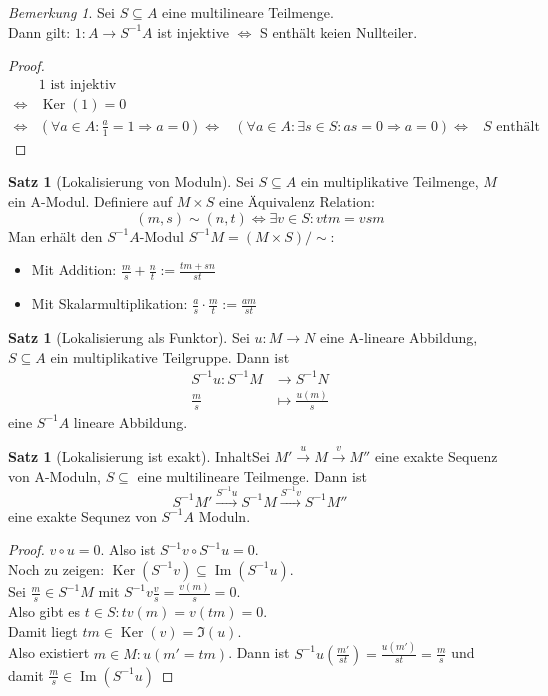 \documentclass[10pt,a4paper]{article}
\newcommand{\Ker}{\ensuremath{\operatorname{Ker}}}
\newcommand{\Img}{\ensuremath{\operatorname{Im}}}
\newcounter{thm}[section]
\theoremstyle{definition}
\newtheorem{satz}[thm]{Satz}
\theoremstyle{plain}
\theoremstyle{remark}
\newtheorem{bem}[thm]{Bemerkung}
\begin{document}
\begin{bem}
	Sei $S\subseteq A$ eine multilineare Teilmenge.\\
	Dann gilt: $1:A\rightarrow S^{-1}A$ ist injektive $\Leftrightarrow$ S enthält keien Nullteiler.
\end{bem}
\begin{proof}
	\begin{align*}
	&1\text{ ist injektiv }\\
	\Leftrightarrow&\Ker(1)=0\\
	\Leftrightarrow&(\forall a\in A:\frac{a}{1}=1\Rightarrow a=0)
	\Leftrightarrow&(\forall a\in A:\exists s\in S:as=0\Rightarrow a=0)
	\Leftrightarrow&\text{$S$ enthält eine Nullteiler}
	\end{align*}
\end{proof}
\begin{satz}[Lokalisierung von Moduln]
	Sei $S\subseteq A$ ein multiplikative Teilmenge, $M$ ein A-Modul. Definiere auf $M\times S$ eine Äquivalenz Relation:
	\[(m,s)\sim (n,t)\Leftrightarrow\exists v\in S:vtm=vsm\]
	Man erhält den $S^{-1}A$-Modul $S^{-1}M=(M\times S)/\sim$:
	\begin{itemize}
		\item Mit Addition: $\frac{m}{s}+\frac{n}{t}:=\frac{tm+sn}{st}$
		\item Mit Skalarmultiplikation: $\frac{a}{s}\cdot \frac{m}{t}:=\frac{am}{st}$
	\end{itemize}
\end{satz}
\begin{satz}[Lokalisierung als Funktor]
	Sei $u:M\rightarrow  N$ eine A-lineare Abbildung, $S\subseteq A$ ein multiplikative Teilgruppe. Dann ist
	\begin{align*}
	S^{-1}u:S^{-1}M&\rightarrow S^{-1}N\\
	\frac{m}{s}&\mapsto \frac{u(m)}{s}
	\end{align*}
	eine $S^{-1}A$ lineare Abbildung.
\end{satz}
\begin{satz}[Lokalisierung ist exakt]
	InhaltSei $M'\xrightarrow{u}M\xrightarrow{v}M''$ eine exakte Sequenz von A-Moduln, $S\subseteq$ eine multilineare Teilmenge. Dann ist
	\[S^{-1}M'\xrightarrow{S^{-1}u}S^{-1}M\xrightarrow{S^{-1}v}S^{-1}M''\]
	eine exakte Sequnez von $S^{-1}A$ Moduln.
\end{satz}
\begin{proof}
	$v\circ u=0$. Also ist $S^{-1}v\circ S^{-1}u=0$.\\
	Noch zu zeigen: $\Ker(S^{-1}v)\subseteq \Img(S^{-1}u)$.\\
	Sei $\frac{m}{s}\in S^{-1}M$ mit $S^{-1}v\frac{v}{s}=\frac{v(m)}{s}=0$.\\
	Also gibt es $t\in S:tv(m)=v(tm)=0$.\\
	Damit liegt $tm\in\Ker(v)=\Im(u)$.\\
	Also existiert $m\in M:u(m'=tm)$.
	Dann ist $S^{-1}u\left(\frac{m'}{st}\right)=\frac{u(m')}{st}=\frac{m}{s}$ und damit $\frac{m}{s}\in\Img(S^{-1}u)$
\end{proof}
\end{document}
